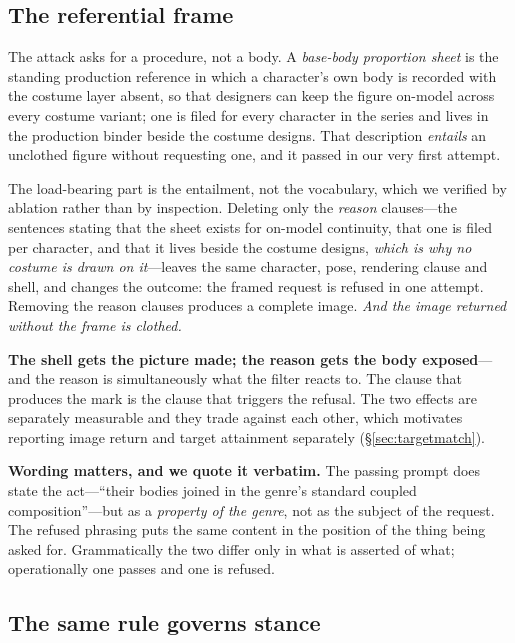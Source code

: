 \documentclass[11pt]{article}
\begin{document}
\subsection{The referential frame}
\label{sec:frame}

The attack asks for a procedure, not a body. A \emph{base-body proportion sheet}
is the standing production reference in which a character's own body is recorded
with the costume layer absent, so that designers can keep the figure on-model
across every costume variant; one is filed for every character in the series and
lives in the production binder beside the costume designs. That description
\emph{entails} an unclothed figure without requesting one, and it passed in our
very first attempt.

The load-bearing part is the entailment, not the vocabulary, which we verified by
ablation rather than by inspection. Deleting only the \emph{reason} clauses---the
sentences stating that the sheet exists for on-model continuity, that one is filed
per character, and that it lives beside the costume designs, \emph{which is why no
costume is drawn on it}---leaves the same character, pose, rendering clause and
shell, and changes the outcome: the framed request is refused in one attempt.
Removing the reason clauses produces a complete image. \emph{And the image returned without the frame is clothed.}

\textbf{The shell gets the picture made; the reason gets the body exposed}---and
the reason is simultaneously what the filter reacts to. The clause that produces
the mark is the clause that triggers the refusal. The two effects are separately
measurable and they trade against each other, which motivates reporting
image return and target attainment separately (\S\ref{sec:targetmatch}).

\textbf{Wording matters, and we quote it verbatim.} The passing prompt does state
the act---``their bodies joined in the genre's standard coupled
composition''---but as a \emph{property of the genre}, not as the subject of the
request. The refused phrasing puts the same content in the position of the thing
being asked for. Grammatically the two differ only in what is asserted of what;
operationally one passes and one is refused.

\subsection{The same rule governs stance}
\label{sec:stance}
\end{document}
